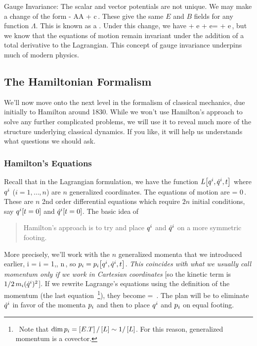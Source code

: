 Gauge Invariance: The scalar and vector potentials are not unique. We may make a change of the form
\beq
\phi\to\phi - \qquad{}\qquad A\to A + c\gder\Lambda\,.
\eeq
These give the same $E$ and $B$ fields for any function $\Lambda$. This is known as a . Under this change, we have
\beq
\lag\to\lag + e + e\dt\pvec\iprod\gder\Lambda = \lag + e\,,
\eeq
but we know that the equations of motion remain invariant under the addition of a total derivative to the Lagrangian. This concept of gauge invariance underpins much of modern physics.


\subsection{The Hamiltonian Formalism}
We'll now move onto the next level in the formalism of classical mechanics, due initially to Hamilton around 1830. While we won't use Hamilton's approach to solve any further complicated problems, we will use it to reveal much more of the structure underlying classical dynamics. If you like, it will help us understands what questions we should ask.


\subsubsection{Hamilton's Equations}
Recall that in the Lagrangian formulation, we have the function $L\!\left[{{q}^{i},{\dot{q}}^{i}, t}\right]$ where ${q}^{i}$ ($i = 1,\dotsc, n$) are $n$ generalized coordinates. The equations of motion are
\beq
{} = 0\,.
\eeq
These are $n$ 2nd order differential equations which require $2n$ initial conditions, say ${q}^{i}\!\left[{t = 0}\right]$ and ${\dot{q}}^{i}\!\left[{t = 0}\right]$. The basic idea of 
\begin{quote}
Hamilton's approach is to try and place ${q}^{i}$ and ${\dot{q}}^{i}$ on a more symmetric footing. 
\end{quote}

More precisely, we'll work with the $n$ generalized momenta that we introduced earlier,
\beq
\gmom i = \qquad{}\qquad i = 1,\dotsc, n\,,
\eeq
so ${p}_{i} = {p}_{i}\!\left[{{q}^{i}, {\dot{q}}^{i}, t}\right]$. \emph{This coincides with what we usually call momentum \emph{only if} we work in Cartesian coordinates} [so the kinetic term is $1/2\,m_i({\dot{q}}^{i})^2$]. If we rewrite Lagrange's equations using the definition of the momentum (the last equation~\footnote{~Note that $\dim {p}_{i} = \left[{E.T}\right]/\left[{L}\right] \sim 1/\left[{L}\right]$. For this reason, generalized momentum is a covector.}), they become
\beq
{} = \,.
\eeq
The plan will be to eliminate ${\dot{q}}^{i}$ in favor of the momenta ${p}_{i}$ and then to place ${q}^{i}$ and ${p}_{i}$ on equal footing.

